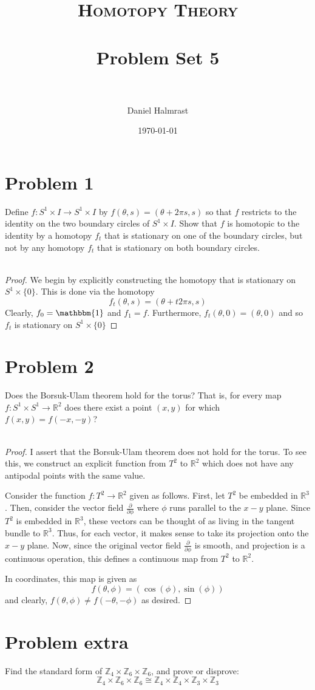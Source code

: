 \documentclass[fontsize=11pt]{scrartcl} %
\title{	
\normalfont \normalsize 
\textsc{Homotopy Theory} \\ [25pt] %
\horrule{0.5pt} \\[0.4cm] %
\huge Problem Set 5 \\ %
\horrule{2pt} \\[0.5cm] %
}
\author{Daniel Halmrast} %
\date{\normalsize\today} %
\numberwithin{equation}{section} %
\numberwithin{figure}{section} %
\numberwithin{table}{section} %
\newcommand{\R}{\mathbb{R}}
\newcommand{\Z}{\mathbb{Z}}
\begin{document}
\maketitle %

\section*{Problem 1}
Define $f:S^1\times I\to S^1\times I$ by $f(\theta,s) = (\theta+2\pi s,s)$ so
that $f$ restricts to the identity on the two boundary circles of $S^1\times I$. 
Show that $f$ is homotopic to the identity by a homotopy $f_t$ that is
stationary on one of the boundary circles, but not by any homotopy $f_t$ that
is stationary on both boundary circles.
\\
\\
\begin{proof}
    We begin by explicitly constructing the homotopy that is stationary on
    $S^1\times\{0\}$. This is done via the homotopy
    \[
        f_t(\theta,s) = (\theta + t2\pi s,s)
    \]
    Clearly, $f_0 = \mathbbm{1}$ and $f_1 = f$. Furthermore, $f_t(\theta,0) =
    (\theta,0)$ and so $f_t$ is stationary on $S^1\times \{0\}$

\end{proof}


\section*{Problem 2}
Does the Borsuk-Ulam theorem hold for the torus? That is, for every map
$f:S^1\times S^1 \to \R^2$ does there exist a point $(x,y)$ for which
$f(x,y) = f(-x,-y)$?
\\
\\
\begin{proof}
    I assert that the Borsuk-Ulam theorem does not hold for the torus. To see
    this, we construct an explicit function from $T^2$ to $\R^2$ which does not
    have any antipodal points with the same value.

    Consider the function $f:T^2\to \R^2$ given as follows. First, let $T^2$ be
    embedded in $\R^3$. Then, consider the vector field
    $\frac{\partial}{\partial\phi}$ where $\phi$ runs parallel to the $x-y$
    plane. Since $T^2$ is embedded in $\R^3$, these vectors can be thought of as
    living in the tangent bundle to $\R^3$. Thus, for each vector, it makes
    sense to take its projection onto the $x-y$ plane. Now, since the original
    vector field $\frac{\partial}{\partial \phi}$ is smooth, and projection is a
    continuous operation, this defines a continuous map from $T^2$ to $\R^2$.

    In coordinates, this map is given as
    \begin{equation}
        f(\theta,\phi) = (\cos(\phi),\sin(\phi))
    \end{equation}
    and clearly, $f(\theta,\phi)\neq f(-\theta,-\phi)$ as desired.
\end{proof}


\section*{Problem extra}
Find the standard form of $\Z_4\times\Z_6\times\Z_6$, and prove or disprove:
\[
    \Z_4\times\Z_6\times\Z_6\cong \Z_4\times\Z_4\times\Z_3\times\Z_3
\]
\end{document}
